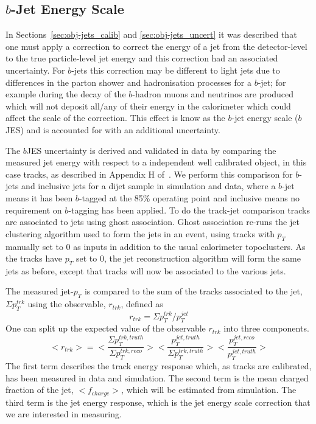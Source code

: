 \clearpage
\subsection{$b$-Jet Energy Scale}
\label{sec:obj-bjets_bjes}

In Sections~\ref{sec:obj-jets_calib} and \ref{sec:obj-jets_uncert} it was described that one
must apply a correction to correct the energy of a jet from the detector-level to the true particle-level jet energy
and this correction had an associated uncertainty.
For $b$-jets this correction may be different to light jets due to differences in the parton shower and hadronisation processes for a $b$-jet;
for example during the decay of the $b$-hadron muons and neutrinos are produced which will not deposit all/any of their energy in the calorimeter
which could affect the scale of the correction. This effect is know as the $b$-jet energy scale ($b$JES) and is accounted for with an additional uncertainty.

The $b$JES uncertainty is derived and validated in data by comparing the measured jet energy with respect to a independent well calibrated object,
in this case tracks, as described in Appendix H of~\cite{dibjet-int_mori16}.
We perform this comparison for $b$-jets and inclusive jets for a dijet sample in simulation and data,
where a $b$-jet means it has been $b$-tagged at the 85\% operating point and inclusive means no requirement on $b$-tagging has been applied. 
To do the track-jet comparison tracks are associated to jets using ghost association.
Ghost association re-runs the jet clustering algorithm used to form the jets in an event,
using tracks with $p_T$ manually set to 0 as inputs in addition to the usual calorimeter topoclusters.
As the tracks have $p_T$ set to 0, the jet reconstruction algorithm will form the same jets as before,
except that tracks will now be associated to the various jets.

The measured jet-$p_T$ is compared to the sum of the tracks associated to the jet, $\Sigma p_T^{trk}$
using the observable, $r_{trk}$, defined as
\begin{equation} 
  r_{trk} = \Sigma p_{T}^{trk}/p_{T}^{jet}
\end{equation}
One can split up the expected value of the observable $r_{trk}$ into three components.
\begin{equation} 
  <r_{trk}> = <\frac{\Sigma p_{T}^{trk,truth}}{\Sigma p_{T}^{trk,reco}}> <\frac{p_{T}^{jet,truth}}{\Sigma p_{T}^{trk,truth}}> <\frac{p_{T}^{jet,reco}}{p_{T}^{jet,truth}}> 
\end{equation}
The first term describes the track energy response which, as tracks are calibrated, has been measured in data and simulation.
The second term is the mean charged fraction of the jet, $<f_{charge}>$, which will be estimated from simulation.
The third term is the jet energy response, which is the jet energy scale correction that we are interested in measuring.

